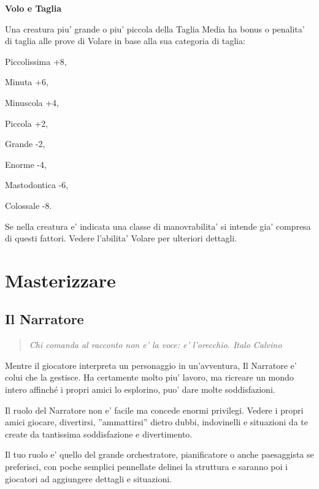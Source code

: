 \documentclass[a4paper,11pt,twoside,openany]{book}
\begin{document}
\textbf{Volo e Taglia}

Una creatura piu' grande o piu' piccola della Taglia Media ha bonus o penalita' di taglia alle prove di Volare in base alla sua categoria di taglia:

Piccolissima +8,

Minuta +6,

Minuscola +4,

Piccola +2,

Grande -2,

Enorme -4,

Mastodontica -6,

Colossale -8.

Se nella creatura e' indicata una classe di manovrabilita' si intende gia' compresa di questi fattori. Vedere l'abilita' Volare per ulteriori dettagli.

\pagebreak

\section{Masterizzare}

\label{masterizzare}


\subsection{Il Narratore}

\begin{quote}\textit{
{Chi comanda al racconto non e' la voce: e' l'orecchio. Italo Calvino}
}\end{quote}


\label{il-narratore}

Mentre il giocatore interpreta un personaggio in un'avventura, Il Narratore e' colui che la gestisce. Ha certamente molto piu' lavoro, ma ricreare un mondo intero affinché i propri amici lo esplorino, puo' dare molte soddisfazioni.

Il ruolo del Narratore non e' facile ma concede enormi privilegi. Vedere i propri amici giocare, divertirsi, ''ammattirsi'' dietro dubbi, indovinelli e situazioni da te create da tantissima soddisfazione e divertimento.

Il tuo ruolo e' quello del grande orchestratore, pianificatore o anche paesaggista se preferisci, con poche semplici pennellate delinei la struttura e saranno poi i giocatori ad aggiungere dettagli e situazioni.
\end{document}
